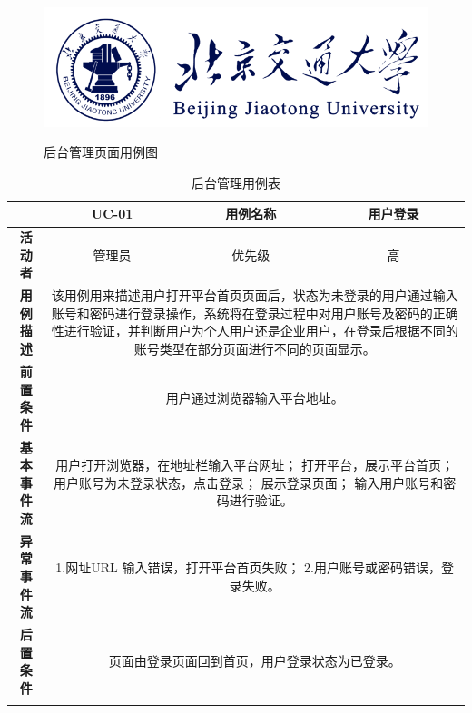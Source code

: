 \begin{figure}[!htb]
	\centering\label{fig:fig6}
	\includegraphics[scale=1]{image/logo1.png}
	\caption{后台管理页面用例图}
\end{figure}

\begin{longtable}[c]{c|ccc}
	\caption{后台管理用例表}
	\label{tab:tab15}\\
	\shline
	\multicolumn{1}{c|}{\textbf{用例编号}} & \multicolumn{1}{c|}{UC-01} & \multicolumn{1}{c|}{用例名称} &  用户登录\\ \hline
	\endhead
	\multicolumn{1}{c|}{\textbf{活动者}} & \multicolumn{1}{c|}{管理员} & \multicolumn{1}{c|}{优先级} &高  \\ \hline
	\textbf{用例描述} & \multicolumn{3}{p{12cm}}{该用例用来描述用户打开平台首页页面后，状态为未登录的用户通过输入账号和密码进行登录操作，系统将在登录过程中对用户账号及密码的正确性进行验证，并判断用户为个人用户还是企业用户，在登录后根据不同的账号类型在部分页面进行不同的页面显示。} \\ \hline
	\textbf{前置条件}& \multicolumn{3}{p{12cm}}{用户通过浏览器输入平台地址。} \\ \hline
	\textbf{基本事件流}& \multicolumn{3}{p{12cm}}{用户打开浏览器，在地址栏输入平台网址；\newline
		打开平台，展示平台首页；\newline
		用户账号为未登录状态，点击登录；\newline
		展示登录页面；\newline
		输入用户账号和密码进行验证。} \\ \hline
	\textbf{异常事件流}& \multicolumn{3}{p{12cm}}{1.网址URL 输入错误，打开平台首页失败；\newline
		2.用户账号或密码错误，登录失败。
	} \\ \hline
	\textbf{后置条件}& \multicolumn{3}{p{12cm}}{页面由登录页面回到首页，用户登录状态为已登录。} \\ \shline
\end{longtable}